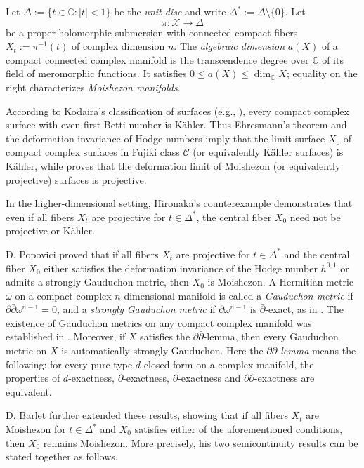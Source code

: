 \documentclass[11pt]{amsart}
\numberwithin{equation}{section}
\theoremstyle{plain}
\theoremstyle{definition}
\newcommand{\C}{\mathbb C}
\newcommand{\cX}{\mathcal X}
\begin{document}
Let $\Delta:=\{t\in\C:|t|<1\}$ be the \emph{unit disc} and write
$\Delta^*:=\Delta\setminus\{0\}$.  Let
\begin{equation}\label{eq:family}
 \pi:\cX\longrightarrow\Delta
\end{equation}
be a proper holomorphic submersion with connected compact fibers
$X_t:=\pi^{-1}(t)$ of complex dimension $n$.  The \emph{algebraic dimension}
$a(X)$ of a compact connected complex manifold is the transcendence degree
over $\C$ of its field of meromorphic functions.  It satisfies
$0\leq a(X)\leq\dim_\C X$; equality on the right characterizes \emph{Moishezon
manifolds}.

According to Kodaira's classification of surfaces (e.g., \cite{Si83,Bu99,Lm99}), every compact complex surface with even first Betti number is K\"ahler. Thus Ehresmann's theorem \cite{Eh47} and the deformation invariance of Hodge numbers imply that the limit surface $X_{0}$ of compact complex surfaces in Fujiki class $\mathcal{C}$ (or equivalently K\"ahler surfaces) is K\"ahler, while \cite[Corollary 1.3]{Po13} proves that the deformation limit of Moishezon (or equivalently projective) surfaces is projective.

In the higher-dimensional setting, Hironaka's counterexample \cite{Hi62} demonstrates that even if all fibers \( X_t \) are projective for \( t \in \Delta^* \), the central fiber \( X_0 \) need not be projective or K\"ahler.

D. Popovici \cite{Po13} proved that if all fibers \( X_t \) are projective for \( t \in \Delta^* \) and the central fiber \( X_0 \) either satisfies the deformation invariance of the Hodge number \( h^{0,1} \) or admits a strongly Gauduchon metric, then \( X_0 \) is Moishezon.
A Hermitian metric $\omega$ on a compact complex $n$-dimensional manifold
is called a \emph{Gauduchon metric} if
$\partial\bar\partial\omega^{n-1}=0$, and a
\emph{strongly Gauduchon metric} if $\partial\omega^{n-1}$ is
$\bar\partial$-exact, as in \cite{Po13}.
The existence of Gauduchon metrics on any compact complex manifold was established in \cite{Ga77}. Moreover, if \( X \) satisfies the \( \partial \bar{\partial} \)-lemma, then every Gauduchon metric on \( X \) is automatically strongly Gauduchon. Here the \emph{$\partial\bar\partial$-lemma} means
the following: for every pure-type $d$-closed form on a complex manifold, the properties of
$d$-exactness, $\partial$-exactness, $\bar\partial$-exactness and
$\partial\bar\partial$-exactness are equivalent. 

D. Barlet \cite{Ba15} further extended these results, showing that if all fibers \( X_t \) are Moishezon for \( t \in \Delta^* \) and \( X_0 \) satisfies either of the aforementioned conditions, then \( X_0 \) remains Moishezon.  
More precisely, his two semicontinuity results can be stated together as
follows.
\end{document}
